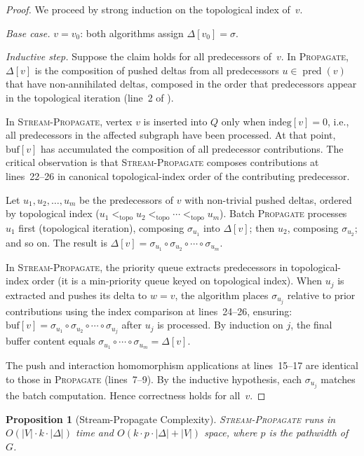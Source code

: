 \documentclass[11pt,a4paper]{article}
\newtheorem{proposition}[theorem]{Proposition}
\theoremstyle{definition}
\DeclareMathOperator{\pred}{pred}
\begin{document}
\begin{proof}
We proceed by strong induction on the topological index of~$v$.

\emph{Base case.}  $v = v_0$: both algorithms assign $\Delta[v_0] = \sigma$.

\emph{Inductive step.}  Suppose the claim holds for all predecessors of~$v$.
In \textsc{Propagate}, $\Delta[v]$ is the composition of pushed deltas from
all predecessors $u \in \pred(v)$ that have non-annihilated deltas, composed
in the order that predecessors appear in the topological iteration (line~2 of
).

In \textsc{Stream-Propagate}, vertex $v$ is inserted into $Q$ only when
$\mathrm{indeg}[v] = 0$, i.e., all predecessors in the affected subgraph
have been processed.  At that point, $\mathrm{buf}[v]$ has accumulated the
composition of all predecessor contributions.  The critical observation is
that \textsc{Stream-Propagate} composes contributions at lines~22--26 in
canonical topological-index order of the contributing predecessor.

Let $u_1, u_2, \ldots, u_m$ be the predecessors of $v$ with non-trivial
pushed deltas, ordered by topological index ($u_1 <_{\mathrm{topo}} u_2
<_{\mathrm{topo}} \cdots <_{\mathrm{topo}} u_m$).  Batch \textsc{Propagate}
processes $u_1$ first (topological iteration), composing $\sigma_{u_1}$ into
$\Delta[v]$; then $u_2$, composing $\sigma_{u_2}$; and so on.  The result is
$\Delta[v] = \sigma_{u_1} \circ \sigma_{u_2} \circ \cdots \circ \sigma_{u_m}$.

In \textsc{Stream-Propagate}, the priority queue extracts predecessors in
topological-index order (it is a min-priority queue keyed on topological
index).  When $u_j$ is extracted and pushes its delta to $w = v$, the
algorithm places $\sigma_{u_j}$ relative to prior contributions using the
index comparison at lines~24--26, ensuring:
$\mathrm{buf}[v] = \sigma_{u_1} \circ \sigma_{u_2} \circ \cdots
\circ \sigma_{u_j}$
after $u_j$ is processed.  By induction on $j$, the final buffer content
equals $\sigma_{u_1} \circ \cdots \circ \sigma_{u_m} = \Delta[v]$.

The push and interaction homomorphism applications at lines~15--17 are
identical to those in \textsc{Propagate} (lines~7--9).  By the inductive
hypothesis, each $\sigma_{u_j}$ matches the batch computation.  Hence
correctness holds for all~$v$.
\end{proof}

\begin{proposition}[Stream-Propagate Complexity]\label{prop:stream-complexity}
\textsc{Stream-Propagate} runs in $O(|V| \cdot k \cdot |\Delta|)$ time and
$O(k \cdot p \cdot |\Delta| + |V|)$ space, where $p$ is the pathwidth
of~$G$.
\end{proposition}
\end{document}
